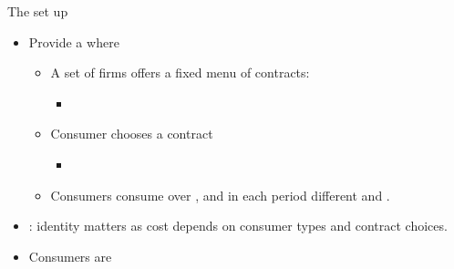 \documentclass{class}
\begin{document}
\begin{frame}{The set up}


\begin{itemize}

\item Provide a  where \vfill
\begin{itemize}
    \item A set of firms offers a fixed menu of contracts: 
    \begin{itemize}
        \item {}
    \end{itemize} \vfill
    \item Consumer chooses a contract
    \begin{itemize}
        \item {}
    \end{itemize} \vfill
    \item Consumers consume over , and in each period different  and .
    \end{itemize}
\end{itemize}

\vfill
\begin{itemize}
    \item {}: identity matters as cost depends on consumer types and contract choices.
        \vfill
    \item Consumers are  
\end{itemize}


\end{frame}

\end{document}

